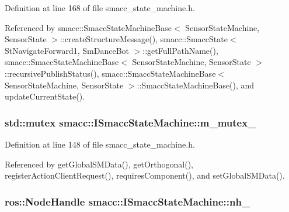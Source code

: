 Definition at line 168 of file smacc\+\_\+state\+\_\+machine.\+h.



Referenced by smacc\+::\+Smacc\+State\+Machine\+Base$<$ Sensor\+State\+Machine, Sensor\+State $>$\+::create\+Structure\+Message(), smacc\+::\+Smacc\+State$<$ St\+Navigate\+Forward1, Sm\+Dance\+Bot $>$\+::get\+Full\+Path\+Name(), smacc\+::\+Smacc\+State\+Machine\+Base$<$ Sensor\+State\+Machine, Sensor\+State $>$\+::recursive\+Publish\+Status(), smacc\+::\+Smacc\+State\+Machine\+Base$<$ Sensor\+State\+Machine, Sensor\+State $>$\+::\+Smacc\+State\+Machine\+Base(), and update\+Current\+State().

\subsubsection[{\texorpdfstring{m\+\_\+mutex\+\_\+}{m_mutex_}}]{\setlength{\rightskip}{0pt plus 5cm}std\+::mutex smacc\+::\+I\+Smacc\+State\+Machine\+::m\+\_\+mutex\+\_\+\hspace{0.3cm}{\ttfamily [private]}}\hypertarget{classsmacc_1_1ISmaccStateMachine_a0eecb19258e0ec026029c7755dbb94d7}{}\label{classsmacc_1_1ISmaccStateMachine_a0eecb19258e0ec026029c7755dbb94d7}


Definition at line 148 of file smacc\+\_\+state\+\_\+machine.\+h.



Referenced by get\+Global\+S\+M\+Data(), get\+Orthogonal(), register\+Action\+Client\+Request(), requires\+Component(), and set\+Global\+S\+M\+Data().

\subsubsection[{\texorpdfstring{nh\+\_\+}{nh_}}]{\setlength{\rightskip}{0pt plus 5cm}ros\+::\+Node\+Handle smacc\+::\+I\+Smacc\+State\+Machine\+::nh\+\_\+\hspace{0.3cm}{\ttfamily [private]}}\hypertarget{classsmacc_1_1ISmaccStateMachine_ad8877bcca9dbb345fe72cca839c93dd3}{}\label{classsmacc_1_1ISmaccStateMachine_ad8877bcca9dbb345fe72cca839c93dd3}


